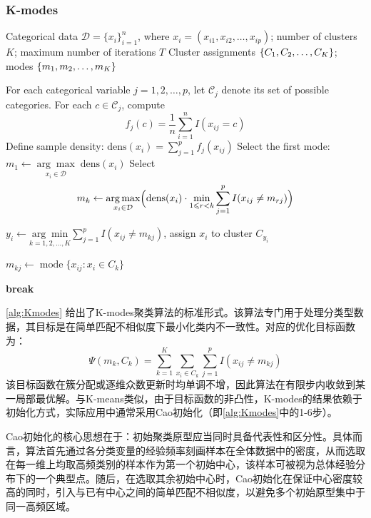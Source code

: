 \subsubsection{K-modes}
\begin{algorithm}[H]
	\caption{K-modes Clustering Algorithm with Cao Initialization}
	\label{alg:Kmodes}
	\begin{algorithmic}[1]
		\Require Categorical data $\mathcal{D}=\{x_i\}_{i=1}^n$, where $x_i=(x_{i1},x_{i2},\dots,x_{ip})$;
		number of clusters $K$;
		maximum number of iterations $T$
		\Ensure Cluster assignments $\{C_1, C_2, \dots, C_{K}\}$;
		modes $\{m_1, m_2, \dots, m_{K}\}$
		
		\State For each categorical variable $j=1,2,\dots,p$, let $\mathcal C_j$ denote its set of possible categories.
		For each $c\in\mathcal C_j$, compute
		\[
		f_j(c)
		=
		\frac{1}{n}
		\sum_{i=1}^n I(x_{ij}=c)
		\]
		\State Define sample density: $\mathrm{dens}(x_i)=\sum\limits_{j=1}^p f_j(x_{ij})$
		\State Select the first mode: $m_1 \gets \underset{x_i\in\mathcal{D}}{\arg\max}\;\mathrm{dens}(x_i)$
		\State Select
		\[
		m_k \gets \underset{x_i\in\mathcal{D}}{\arg\max}
		\Bigl(
		\mathrm{dens}(x_i)\cdot
		\min_{1\leqslant r<k}\sum_{j=1}^p I(x_{ij}\neq m_{rj})
		\Bigr)
		\]
		\EndFor
		
		 
		\State $y_i \gets \underset{k=1,2,\dots,K}{\arg\min}
		\sum\limits_{j=1}^p I(x_{ij}\neq m_{kj})$, assign $x_i$ to cluster $C_{y_i}$
		\EndFor
		
		 
		\State $m_{kj} \gets \operatorname{mode}\{x_{ij}:x_i\in C_k\}$
		\EndFor
		\EndFor
		
		\State \textbf{break}
		\EndIf
		\EndFor
	\end{algorithmic}
\end{algorithm}
\cref{alg:Kmodes} 给出了K-modes聚类算法的标准形式。该算法专门用于处理分类型数据，其目标是在简单匹配不相似度下最小化类内不一致性。对应的优化目标函数为：
\begin{equation*}
	\Psi({m_k},{C_k})=
	\sum_{k=1}^K\sum_{x_i\in C_k}\sum_{j=1}^p I(x_{ij}\neq m_{kj})
\end{equation*}
该目标函数在簇分配或逐维众数更新时均单调不增，因此算法在有限步内收敛到某一局部最优解。与K-means类似，由于目标函数的非凸性，K-modes的结果依赖于初始化方式，实际应用中通常采用Cao初始化（即\cref{alg:Kmodes}中的1-6步）。\par
Cao初始化的核心思想在于：初始聚类原型应当同时具备代表性和区分性。具体而言，算法首先通过各分类变量的经验频率刻画样本在全体数据中的密度，从而选取在每一维上均取高频类别的样本作为第一个初始中心，该样本可被视为总体经验分布下的一个典型点。随后，在选取其余初始中心时，Cao初始化在保证中心密度较高的同时，引入与已有中心之间的简单匹配不相似度，以避免多个初始原型集中于同一高频区域。
